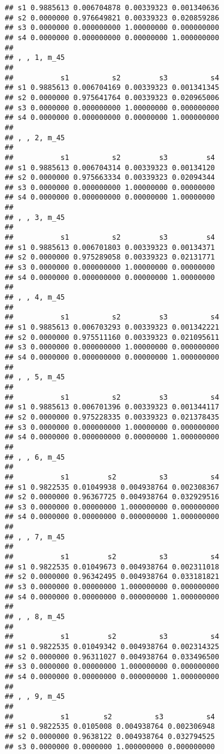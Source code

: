 \documentclass[
]{article}
\begin{document}
\begin{verbatim}
## s1 0.9885613 0.006704878 0.00339323 0.001340636
## s2 0.0000000 0.976649821 0.00339323 0.020859286
## s3 0.0000000 0.000000000 1.00000000 0.000000000
## s4 0.0000000 0.000000000 0.00000000 1.000000000
## 
## , , 1, m_45
## 
##           s1          s2         s3          s4
## s1 0.9885613 0.006704169 0.00339323 0.001341345
## s2 0.0000000 0.975641764 0.00339323 0.020965006
## s3 0.0000000 0.000000000 1.00000000 0.000000000
## s4 0.0000000 0.000000000 0.00000000 1.000000000
## 
## , , 2, m_45
## 
##           s1          s2         s3         s4
## s1 0.9885613 0.006704314 0.00339323 0.00134120
## s2 0.0000000 0.975663334 0.00339323 0.02094344
## s3 0.0000000 0.000000000 1.00000000 0.00000000
## s4 0.0000000 0.000000000 0.00000000 1.00000000
## 
## , , 3, m_45
## 
##           s1          s2         s3         s4
## s1 0.9885613 0.006701803 0.00339323 0.00134371
## s2 0.0000000 0.975289058 0.00339323 0.02131771
## s3 0.0000000 0.000000000 1.00000000 0.00000000
## s4 0.0000000 0.000000000 0.00000000 1.00000000
## 
## , , 4, m_45
## 
##           s1          s2         s3          s4
## s1 0.9885613 0.006703293 0.00339323 0.001342221
## s2 0.0000000 0.975511160 0.00339323 0.021095611
## s3 0.0000000 0.000000000 1.00000000 0.000000000
## s4 0.0000000 0.000000000 0.00000000 1.000000000
## 
## , , 5, m_45
## 
##           s1          s2         s3          s4
## s1 0.9885613 0.006701396 0.00339323 0.001344117
## s2 0.0000000 0.975228335 0.00339323 0.021378435
## s3 0.0000000 0.000000000 1.00000000 0.000000000
## s4 0.0000000 0.000000000 0.00000000 1.000000000
## 
## , , 6, m_45
## 
##           s1         s2          s3          s4
## s1 0.9822535 0.01049938 0.004938764 0.002308367
## s2 0.0000000 0.96367725 0.004938764 0.032929516
## s3 0.0000000 0.00000000 1.000000000 0.000000000
## s4 0.0000000 0.00000000 0.000000000 1.000000000
## 
## , , 7, m_45
## 
##           s1         s2          s3          s4
## s1 0.9822535 0.01049673 0.004938764 0.002311018
## s2 0.0000000 0.96342495 0.004938764 0.033181821
## s3 0.0000000 0.00000000 1.000000000 0.000000000
## s4 0.0000000 0.00000000 0.000000000 1.000000000
## 
## , , 8, m_45
## 
##           s1         s2          s3          s4
## s1 0.9822535 0.01049342 0.004938764 0.002314325
## s2 0.0000000 0.96311027 0.004938764 0.033496500
## s3 0.0000000 0.00000000 1.000000000 0.000000000
## s4 0.0000000 0.00000000 0.000000000 1.000000000
## 
## , , 9, m_45
## 
##           s1        s2          s3          s4
## s1 0.9822535 0.0105008 0.004938764 0.002306948
## s2 0.0000000 0.9638122 0.004938764 0.032794525
## s3 0.0000000 0.0000000 1.000000000 0.000000000

\end{verbatim}
\end{document}
